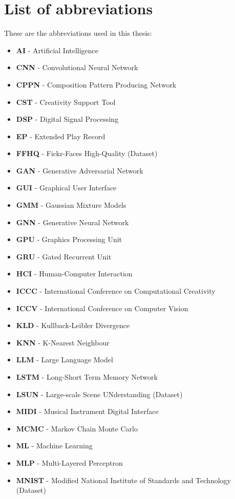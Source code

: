 \chapter*{List of abbreviations}

These are the abbreviations used in this thesis: 
\begin{itemize}
\item \textbf{AI} - Artificial Intelligence
\item \textbf{CNN} - Convolutional Neural Network
\item \textbf{CPPN} - Composition Pattern Producing Network
\item \textbf{CST} - Creativity Support Tool
\item \textbf{DSP} - Digital Signal Processing
\item \textbf{EP} - Extended Play Record
\item \textbf{FFHQ} - Fickr-Faces High-Quality (Dataset)
\item \textbf{GAN} - Generative Adversarial Network
\item \textbf{GUI} - Graphical User Interface
\item \textbf{GMM} - Gaussian Mixture Models
\item \textbf{GNN} - Generative Neural Network
\item \textbf{GPU} - Graphics Processing Unit
\item \textbf{GRU} - Gated Recurrent Unit
\item \textbf{HCI} - Human-Computer Interaction
\item \textbf{ICCC} - International Conference on Computational Creativity
\item \textbf{ICCV} - International Conference on Computer Vision
\item \textbf{KLD} - Kullback-Leibler Divergence
\item \textbf{KNN} - K-Nearest Neighbour
\item \textbf{LLM} - Large Language Model
\item \textbf{LSTM} - Long-Short Term Memory Network
\item \textbf{LSUN} - Large-scale Scene UNderstanding (Dataset)
\item \textbf{MIDI} - Musical Instrument Digital Interface
\item \textbf{MCMC} - Markov Chain Monte Carlo
\item \textbf{ML} - Machine Learning
\item \textbf{MLP} - Multi-Layered Perceptron
\item \textbf{MNIST} - Modified National Institute of Standards and Technology (Dataset)

\end{itemize}
